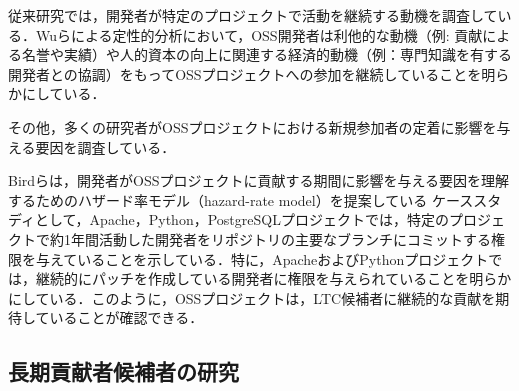 \documentclass[submit,techrep,noauthor]{ipsj}
\begin{document}
従来研究では，開発者が特定のプロジェクトで活動を継続する動機を調査している．Wuらによる定性的分析において，OSS開発者は利他的な動機（例: 貢献による名誉や実績）や人的資本の向上に関連する経済的動機（例：専門知識を有する開発者との協調）をもってOSSプロジェクトへの参加を継続していることを明らかにしている\cite{motivation2}．

その他，多くの研究者がOSSプロジェクトにおける新規参加者の定着に影響を与える要因を調査している\cite{LTC}\cite{bib1}\cite{bib2}\cite{}．

Birdらは，開発者がOSSプロジェクトに貢献する期間に影響を与える要因を理解するためのハザード率モデル（hazard-rate model）を提案している\cite{bib1}
ケーススタディとして，Apache，Python，PostgreSQLプロジェクトでは，特定のプロジェクトで約1年間活動した開発者をリポジトリの主要なブランチにコミットする権限を与えていることを示している．特に，ApacheおよびPythonプロジェクトでは，継続的にパッチを作成している開発者に権限を与えられていることを明らかにしている．このように，OSSプロジェクトは，LTC候補者に継続的な貢献を期待していることが確認できる．


\subsection{長期貢献者候補者の研究}
\end{document}
